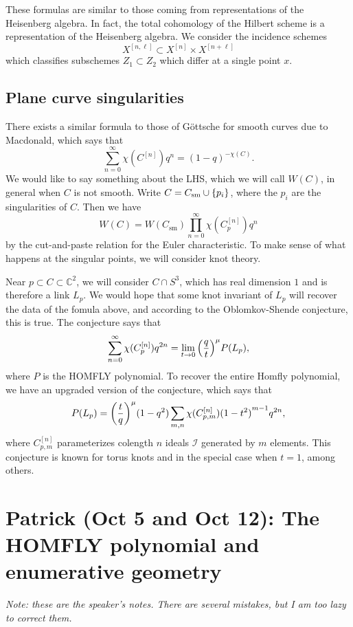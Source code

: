 \documentclass[leqno, openany]{memoir}
\theoremstyle{definition}
\theoremstyle{remark}
\theoremstyle{plain}
\theoremstyle{definition}
\theoremstyle{remark}
\newcommand{\C}{\mathbb{C}}
\newcommand{\mc}[1]{\mathcal{#1}}
\newcommand{\mr}[1]{\mathrm{#1}}
\newcommand{\1}{\mathbf{1}}
\newcommand{\2}{\mathbf{2}}
\newcommand{\3}{\mathbf{3}}
\begin{document}
These formulas are similar to those coming from representations of the Heisenberg algebra. In fact, the total cohomology of the Hilbert scheme is a representation of the Heisenberg algebra. We consider the incidence schemes
\[ X^{[n, \ell]} \subset X^{[n]} \times X^{[n+\ell]} \]
which classifies subschemes $Z_1 \subset Z_2$ which differ at a single point $x$.

\section{Plane curve singularities}%
\label{sec:plane_curve_singularities}

There exists a similar formula to those of G\"ottsche for smooth curves due to Macdonald, which says that
\[ \sum_{n=0}^{\infty} \chi(C^{[n]}) q^n = {(1-q)}^{-\chi(C)}. \]
We would like to say something about the LHS, which we will call $W(C)$, in general when $C$ is not smooth. Write $C = C_{\mr{sm}} \cup \qty{p_i}$, where the $p_i$ are the singularities of $C$. Then we have
\[ W(C) = W(C_{\mr{sm}}) \prod_{n=0}^{\infty} \chi(C_p^{[n]}) q^n \]
by the cut-and-paste relation for the Euler characteristic. To make sense of what happens at the singular points, we will consider knot theory.

Near $p \subset C \subset \C^2$, we will consider $C \cap S^3$, which has real dimension $1$ and is therefore a link $L_p$. We would hope that some knot invariant of $L_p$ will recover the data of the fomula above, and according to the Oblomkov-Shende conjecture, this is true. The conjecture says that
\[ \sum_{n=0}^{\infty} \chi(C_p^{[n]}) q^{2n} = \lim_{t \to 0} {\qty(\frac{q}{t})}^{\mu} P(L_p), \]
where $P$ is the HOMFLY polynomial. To recover the entire Homfly polynomial, we have an upgraded version of the conjecture, which says that
\[ P(L_p) = {\qty(\frac{t}{q})}^{\mu} (1-q^2) \sum_{m,n} \chi(C_{p,m}^{[n]}) {(1-t^2)}^{m-1} q^{2n}, \]
where $C_{p,m}^{[n]}$ parameterizes colength $n$ ideals $\mc{I}$ generated by $m$ elements. This conjecture is known for torus knots and in the special case when $t = 1$, among others.

\chapter{Patrick (Oct 5 and Oct 12): The HOMFLY polynomial and enumerative geometry}%
\label{cha:patrick_oct_5_and_oct_12_homfly_}

\textit{Note: these are the speaker's notes. There are several mistakes, but I am too lazy to correct them.} 
\end{document}

